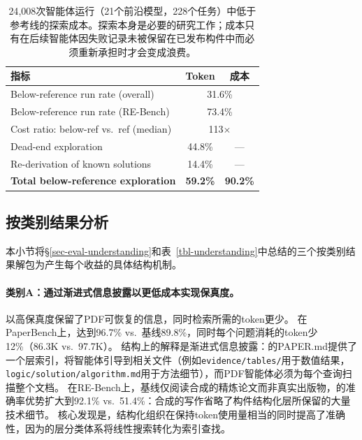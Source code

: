 \begin{table}[h]
\centering
\small
\begin{tabular}{lcc}
\toprule
\textbf{指标} & \textbf{Token} & \textbf{成本} \\
\midrule
Below-reference run rate (overall)        & \multicolumn{2}{c}{31.6\%} \\
Below-reference run rate (RE-Bench)       & \multicolumn{2}{c}{73.4\%} \\
Cost ratio: below-ref vs.\ ref (median)   & \multicolumn{2}{c}{113$\times$} \\
Dead-end exploration                       & 44.8\% & --- \\
Re-derivation of known solutions           & 14.4\% & --- \\
\textbf{Total below-reference exploration} & \textbf{59.2\%} & \textbf{90.2\%} \\
\bottomrule
\end{tabular}
\caption{24{,}008次智能体运行（21个前沿模型，228个任务）中低于参考线的探索成本。探索本身是必要的研究工作；成本只有在后续智能体因失败记录未被保留在已发布构件中而必须重新承担时才会变成浪费。}
\label{tbl-exploration-tax}
\end{table}

\subsection{按类别结果分析}
\label{sec-understanding-per-category}

本小节将\S\ref{sec-eval-understanding}和表~\ref{tbl-understanding}中总结的三个按类别结果解包为产生每个收益的具体结构机制。

\paragraph{类别A：通过渐进式信息披露以更低成本实现保真度。}
\ara{}以高保真度保留了PDF可恢复的信息，同时检索所需的token更少。
在PaperBench上，\ara{}达到96.7\% vs.\ 基线89.8\%，同时每个问题消耗的token少12\%（86.3K vs.\ 97.7K）。
结构上的解释是渐进式信息披露：\ara{}的PAPER.md提供了一个层索引，将智能体引导到相关文件（例如\texttt{evidence/tables/}用于数值结果，\texttt{logic/solution/algorithm.md}用于方法细节），而PDF智能体必须为每个查询扫描整个文档。
在RE-Bench上，基线仅阅读合成的精炼论文而非真实出版物，\ara{}的准确率优势扩大到92.1\% vs.\ 51.4\%：合成的写作省略了构件结构化层所保留的大量技术细节。
核心发现是，结构化组织在保持token使用量相当的同时提高了准确性，因为\ara{}的层分类体系将线性搜索转化为索引查找。

